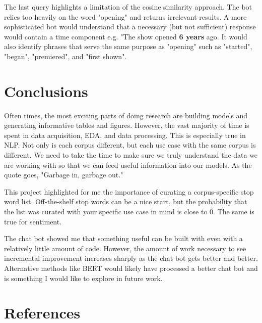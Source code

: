 \documentclass{article}
\begin{document}
The last query highlights a limitation of the cosine similarity approach. The bot relies too heavily on the word "opening" and returns irrelevant results. A more sophisticated bot would understand that a necessary (but not sufficient) response would contain a time component e.g. "The show opened \textbf{6 years} ago. It would also identify phrases that serve the same purpose as "opening" such as "started", "began", "premiered", and "first shown". 

\section{Conclusions}

Often times, the most exciting parts of doing research are building models and generating informative tables and figures. However, the vast majority of time is spent in data acquisition, EDA, and data processing. This is especially true in NLP. Not only is each corpus different, but each use case with the same corpus is different. We need to take the time to make sure we truly understand the data we are working with so that we can feed useful information into our models. As the quote goes, "Garbage in, garbage out."

This project highlighted for me the importance of curating a corpus-specific stop word list. Off-the-shelf stop words can be a nice start, but the probability that the list was curated with your specific use case in mind is close to 0. The same is true for sentiment. 

The chat bot showed me that something useful can be built with even with a relatively little amount of code. However, the amount of work necessary to see incremental improvement increases sharply as the chat bot gets better and better. Alternative methods like BERT would likely have processed a better chat bot and is something I would like to explore in future work. 

\section{References}



\end{document}

